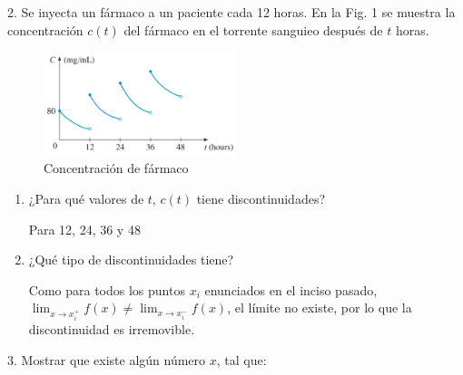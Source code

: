 \documentclass[12pt]{article}
\begin{document}
2. Se inyecta un fármaco a un paciente cada 12 horas. En la Fig. 1 se muestra la concentración $c(t)$ del fármaco en el torrente sanguieo después de $t$ horas.
\begin{figure}[h]
    \centering
    \includegraphics[width=0.5\textwidth]{fig1}
    \caption{Concentraci\'on de f\'armaco}
\end{figure}
\begin{enumerate}[\hspace{9px} a)]
    \item ¿Para qué valores de $t$, $c(t)$ tiene discontinuidades?
    
        Para 12, 24, 36 y 48

    \item ¿Qué tipo de discontinuidades tiene?
    
        Como para todos los puntos $x_i$ enunciados en el inciso pasado, \(\displaystyle\lim_{x \to x_i^+}f(x) \neq \lim_{x \to x_i^-}f(x)\), el l\'imite no existe, por lo que la discontinuidad es irremovible.\\\vspace{\fill}

\end{enumerate}

\bigskip

3. Mostrar que existe algún número $x$, tal que:
\end{document}

